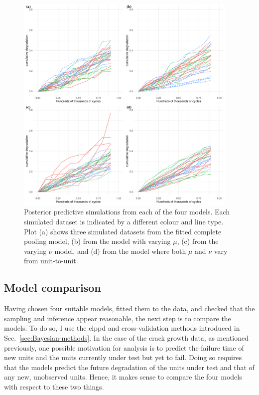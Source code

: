 \begin{figure}
   \centering
   \includegraphics[width=0.95\textwidth]{./figures/ch-5/post_pc.pdf}
   \caption{Posterior predictive simulations from each of the four models. Each simulated dataset is indicated by a different colour and line type. Plot (a) shows three simulated datasets from the fitted complete pooling model, (b) from the model with varying $\mu$, (c) from the varying $\nu$ model, and (d) from the model where both $\mu$ and $\nu$ vary from unit-to-unit.}
   \label{fig:post-pc} 
\end{figure}

\subsection{Model comparison}
\label{subsec:modcomp}

Having chosen four suitable models, fitted them to the data, and checked that the sampling and inference appear reasonable, the next step is to compare the models. To do so, I use the elppd and cross-validation methods introduced in Sec.~\ref{sec:Bayesian-methods}. In the case of the crack growth data, as mentioned previously, one possible motivation for analysis is to predict the failure time of new units and the units currently under test but yet to fail. Doing so requires that the models predict the future degradation of the units under test and that of any new, unobserved units. Hence, it makes sense to compare the four models with respect to these two things.

